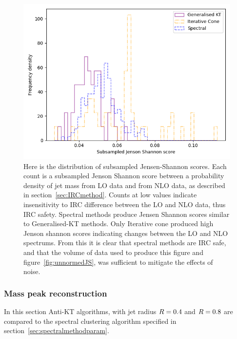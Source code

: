 \begin{figure}[htp]
    \begin{minipage}[c]{0.6\textwidth}
    \includegraphics[width=1.\textwidth]{graphics/JensenShannon.png}
    \end{minipage}\hfill
    \begin{minipage}[c]{0.35\textwidth}
    \caption{Here is the distribution of subsampled Jensen-Shannon scores.
        Each count is a subsampled Jenson Shannon score between a probability density of jet mass from LO data and
        from NLO data, as described in section~\ref{sec:IRCmethod}.
        Counts at low values indicate insensitivity to IRC difference between the LO and NLO data,
        thus IRC safety.
        Spectral methods produce Jensen Shannon scores similar to Generalised-KT
        methods. Only Iterative cone produced high Jenson shannon scores indicating changes
        between the LO and NLO spectrums.
        From this it is clear that spectral methods are IRC safe,
        and that the volume of data used to produce this figure and figure~\ref{fig:unnormedJS},
        was sufficient to mitigate the effects of noise.
    }\label{fig:jensenshannon}
    \end{minipage}
\end{figure}    


\FloatBarrier{}
\subsubsection{Mass peak reconstruction}
In this section Anti-KT algorithms, with jet radius \(R{} = 0.4\) and \(R{} = 0.8\)
are compared to the spectral clustering algorithm specified in section~\ref{sec:spectralmethodparam}.

